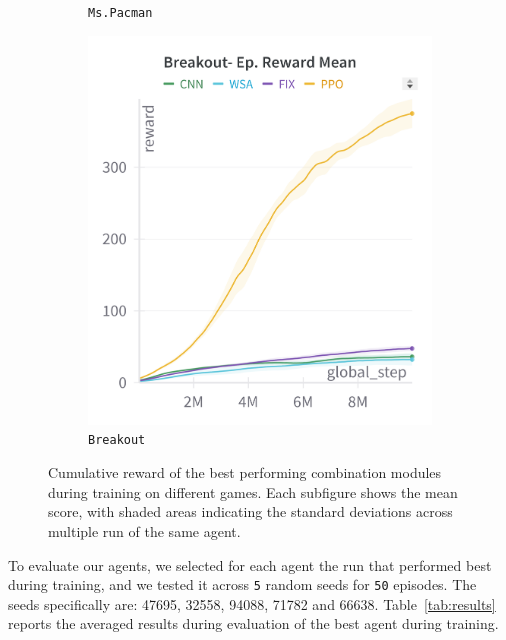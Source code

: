 \begin{figure}[ht]
\begin{subfigure}[b]{0.32\textwidth}
        \caption{\texttt{Ms.Pacman}}
        \label{fig:mspacmantrain}
    \end{subfigure}
    \hfill
    \begin{subfigure}[b]{0.32\textwidth}
        \centering
        \includegraphics[width=\textwidth]{images/breakout_train}
        \caption{\texttt{Breakout}}
        \label{fig:breakouttrain}
    \end{subfigure}
    \caption{Cumulative reward of the best performing combination modules during training on different games. Each subfigure shows the mean score, with shaded areas indicating the standard deviations across multiple run of the same agent.}
    \label{fig:trainresults}
\end{figure}


To evaluate our agents, we selected for each agent the run that performed best during training, and we tested it across \texttt{5} random seeds for \texttt{50} episodes.
The seeds specifically are: 47695, 32558, 94088, 71782 and 66638.
Table~\ref{tab:results} reports the averaged results during evaluation of the best agent during training.

